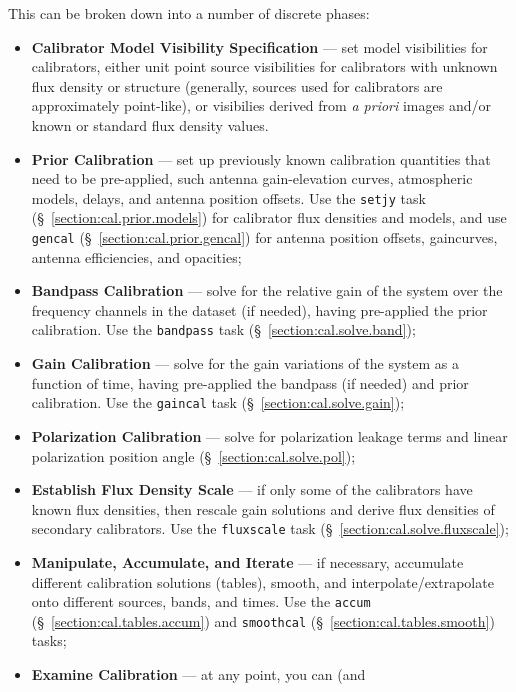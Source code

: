 This can be broken down into a number of discrete phases:
\begin{itemize}
   \item {\bf Calibrator Model Visibility Specification} --- set
      model visibilities for calibrators, either unit point source
      visibilities for calibrators with unknown flux density or
      structure (generally, sources used for calibrators are
      approximately point-like), or visibilies derived from {\em a
      priori} images and/or known or standard flux density values.
   \item {\bf Prior Calibration} --- set up previously known
      calibration quantities that need to be pre-applied, such
      antenna
      gain-elevation curves, atmospheric models, delays, and
      antenna position offsets. Use the
      {\tt setjy} task (\S~\ref{section:cal.prior.models}) for
      calibrator flux
      densities and models, and use {\tt gencal} (\S~\ref{section:cal.prior.gencal})
      for antenna position offsets, gaincurves, antenna efficiencies,
      and opacities;
   \item {\bf Bandpass Calibration} --- solve
      for the relative gain of the system over the frequency channels 
      in the dataset (if needed), having pre-applied the prior
      calibration. Use the {\tt bandpass} task 
      (\S~\ref{section:cal.solve.band});
   \item {\bf Gain Calibration} --- solve for the gain variations of
      the system as a function of time, having pre-applied the 
      bandpass (if needed) and prior calibration. Use the 
      {\tt gaincal} task (\S~\ref{section:cal.solve.gain});
   \item {\bf Polarization Calibration} --- solve for 
      polarization leakage terms and linear polarization position angle
      (\S~\ref{section:cal.solve.pol});
   \item {\bf Establish Flux Density Scale} --- if only some of the
      calibrators have known flux densities, then rescale gain
      solutions and derive flux densities of secondary calibrators.
      Use the {\tt fluxscale} task (\S~\ref{section:cal.solve.fluxscale});
   \item {\bf Manipulate, Accumulate, and Iterate} --- if necessary,
      accumulate different calibration solutions (tables), smooth,
      and interpolate/extrapolate onto different sources, bands, and
      times. Use the {\tt accum} (\S~\ref{section:cal.tables.accum}) and
      {\tt smoothcal} (\S~\ref{section:cal.tables.smooth})
      tasks;
   \item {\bf Examine Calibration} --- at any point, you can (and 

\end{itemize}
